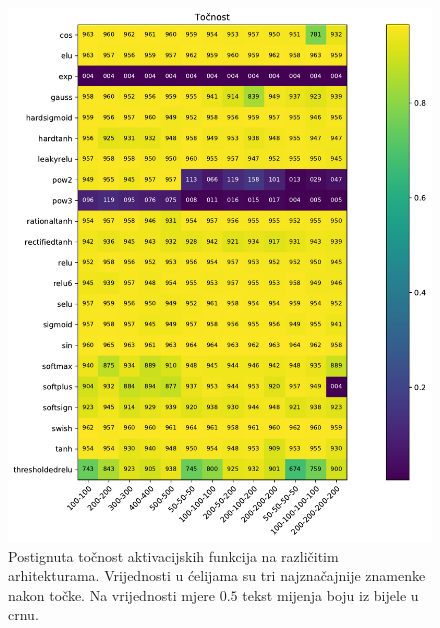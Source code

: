\documentclass[times, utf8, numeric, diplomski]{fer}
\begin{document}
\begin{figure}[ht]
\includegraphics[width=\textwidth]{greedy_9_acc.pdf}
\centering
\caption{Postignuta točnost aktivacijskih funkcija na različitim arhitekturama. Vrijednosti u ćelijama su tri najznačajnije znamenke nakon točke. Na vrijednosti mjere $0.5$ tekst mijenja boju iz bijele u crnu.}
\label{fig:greedy_9_acc}
\end{figure}
\end{document}
